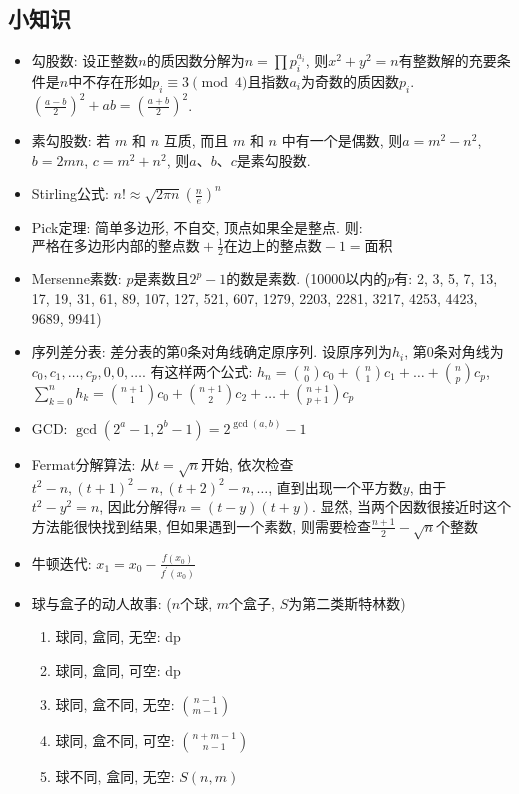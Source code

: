 \documentclass[landscape, twocolumn, 8pt, a4paper, twoside]{extarticle}
\begin{document}
\subsection{小知识}
\begin{itemize}
\item 勾股数: 设正整数$n$的质因数分解为$n = \prod p_i ^ {a_i}$, 
  则$x^2+y^2=n$有整数解的充要条件是$n$中不存在形如$p_i \equiv 3\pmod{4}$且指数$a_i$为奇数的质因数$p_i$.
  $(\frac{a - b}{2})^2 + ab = (\frac{a + b}{2})^2$.
\item 素勾股数: 若 $m$ 和 $n$ 互质, 而且 $m$ 和 $n$ 中有一个是偶数, 则$a = m^2 - n^2$, $b = 2mn$, $c = m^2 + n^2$, 则$a$、$b$、$c$是素勾股数. 
\item Stirling公式: $n! \approx \sqrt{2 \pi n} (\frac{n}{e})^n$
\item Pick定理: 简单多边形, 不自交, 顶点如果全是整点. 则: 
  $ \textrm{严格在多边形内部的整点数} + \frac{1}{2} \textrm{在边上的整点数} - 1 = \textrm{面积}$
\item Mersenne素数: $p$是素数且$2^p-1$的数是素数. (10000以内的$p$有: 2, 3, 5, 7, 13, 17, 19, 31, 61, 89, 107, 127, 521, 607, 1279, 2203, 2281, 3217, 4253, 4423, 9689, 9941)
\item 序列差分表: 差分表的第$0$条对角线确定原序列. 
  设原序列为$h_i$, 第$0$条对角线为$c_0,c_1,\ldots,c_p,0,0,\ldots$. 
  有这样两个公式: 
  $h_n = \binom{n}{0}c_0 + \binom{n}{1}c_1 + \ldots + \binom{n}{p} c_p$, 
  $\sum_{k = 0}^{n}h_k = \binom{n+1}{1}c_0 + \binom{n+1}{2}c_2 + \ldots + \binom{n+1}{p+1}c_p$
\item GCD:
  $\gcd(2^a-1,2^b-1)=2^{\gcd(a,b)}-1$
\item Fermat分解算法: 
  从$t=\sqrt{n}$开始, 
  依次检查$t^2-n,(t+1)^2-n,(t+2)^2-n,\ldots$, 
  直到出现一个平方数$y$, 
  由于$t ^ 2 - y ^ 2 = n$, 
  因此分解得$n = (t -y)(t + y)$. 
  显然, 当两个因数很接近时这个方法能很快找到结果, 
  但如果遇到一个素数, 则需要检查$\frac{n + 1}{2} - \sqrt{n}$个整数
\item 牛顿迭代:
  $x_1 = x_0 - \frac{f(x_0)}{f^\prime(x_0)}$
\item 球与盒子的动人故事: ($n$个球, $m$个盒子, $S$为第二类斯特林数)
  \begin{enumerate}
  \item 球同, 盒同, 无空: dp
  \item 球同, 盒同, 可空: dp
  \item 球同, 盒不同, 无空: $\binom{n - 1}{m - 1}$
  \item 球同, 盒不同, 可空: $\binom{n + m - 1}{n - 1}$
  \item 球不同, 盒同, 无空: $S(n, m)$

\end{enumerate}
\end{itemize}
\end{document}
